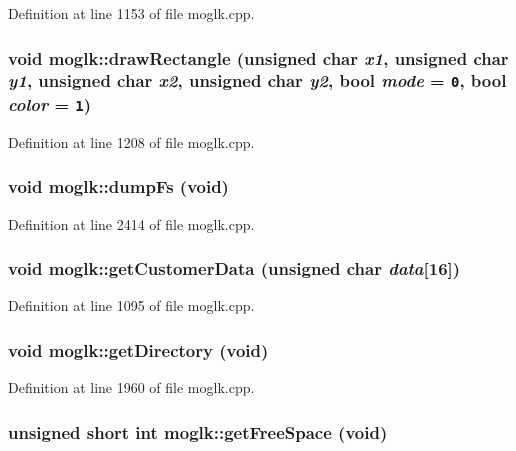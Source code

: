 Definition at line 1153 of file moglk.cpp.\hypertarget{classmoglk_df18bd7ec24c35851bc72d6d09a99483}{
\subsubsection[{drawRectangle}]{\setlength{\rightskip}{0pt plus 5cm}void moglk::drawRectangle (unsigned char {\em x1}, \/  unsigned char {\em y1}, \/  unsigned char {\em x2}, \/  unsigned char {\em y2}, \/  bool {\em mode} = {\tt 0}, \/  bool {\em color} = {\tt 1})}}
\label{classmoglk_df18bd7ec24c35851bc72d6d09a99483}




Definition at line 1208 of file moglk.cpp.\hypertarget{classmoglk_7f929ca25d08f1c116cd43152b7373f3}{
\subsubsection[{dumpFs}]{\setlength{\rightskip}{0pt plus 5cm}void moglk::dumpFs (void)}}
\label{classmoglk_7f929ca25d08f1c116cd43152b7373f3}




Definition at line 2414 of file moglk.cpp.\hypertarget{classmoglk_75192d11f9a4e9abe2ba5b31c41ca772}{
\subsubsection[{getCustomerData}]{\setlength{\rightskip}{0pt plus 5cm}void moglk::getCustomerData (unsigned char {\em data}\mbox{[}16\mbox{]})}}
\label{classmoglk_75192d11f9a4e9abe2ba5b31c41ca772}




Definition at line 1095 of file moglk.cpp.\hypertarget{classmoglk_06a6671f138121034a345e2cbd6497f8}{
\subsubsection[{getDirectory}]{\setlength{\rightskip}{0pt plus 5cm}void moglk::getDirectory (void)}}
\label{classmoglk_06a6671f138121034a345e2cbd6497f8}




Definition at line 1960 of file moglk.cpp.\hypertarget{classmoglk_8dc3413e387ae4df9e10e73bd97fbdc5}{
\subsubsection[{getFreeSpace}]{\setlength{\rightskip}{0pt plus 5cm}unsigned short int moglk::getFreeSpace (void)}}
\label{classmoglk_8dc3413e387ae4df9e10e73bd97fbdc5}




